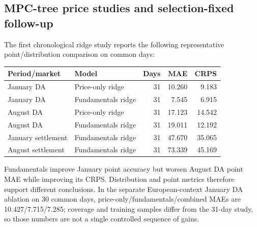 \subsection{MPC-tree price studies and selection-fixed follow-up}
The first chronological ridge study reports the following representative
point/distribution comparison on common days:
\begin{center}\small
\begin{tabular}{llrrr}
\toprule Period/market & Model & Days & MAE & CRPS\\\midrule
January DA & Price-only ridge & 31 & 10.260 & 9.183\\
January DA & Fundamentals ridge & 31 & 7.545 & 6.915\\
August DA & Price-only ridge & 31 & 17.123 & 14.542\\
August DA & Fundamentals ridge & 31 & 19.011 & 12.192\\
January settlement & Fundamentals ridge & 31 & 47.670 & 35.065\\
August settlement & Fundamentals ridge & 31 & 73.339 & 45.169\\
\bottomrule\end{tabular}\end{center}
Fundamentals improve January point accuracy but worsen August DA point MAE
while improving its CRPS. Distribution and point metrics therefore support
different conclusions. In the separate European-context January DA ablation
on 30 common days, price-only/fundamentals/combined MAEs are 10.427/7.715/7.285;
coverage and training samples differ from the 31-day study, so those numbers
are not a single controlled sequence of gains.

